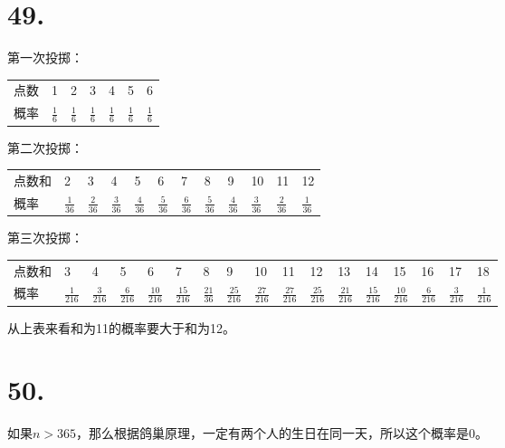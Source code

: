 \documentclass[UTF8]{report}
\begin{document}
    \section*{49.}
        第一次投掷：

        \begin{table}[!htbp]
            \begin{tabular}{lllllll}
                点数 & 1 & 2 & 3 & 4 & 5 & 6 \\
                概率 & $\frac{1}{6}$ & $\frac{1}{6}$ & $\frac{1}{6}$ &
                $\frac{1}{6}$ & $\frac{1}{6}$ & $\frac{1}{6}$
            \end{tabular}
        \end{table}

        第二次投掷：

        \begin{table}[!htbp]
            \begin{tabular}{llllllllllll}
                点数和 & 2 & 3 & 4 & 5 & 6 & 7 & 8 & 9 & 10 & 11 & 12 \\
                概率 & $\frac{1}{36}$ & $\frac{2}{36}$ & $\frac{3}{36}$ &
                $\frac{4}{36}$ & $\frac{5}{36}$ & $\frac{6}{36}$ &
                $\frac{5}{36}$ & $\frac{4}{36}$ & $\frac{3}{36}$ &
                $\frac{2}{36}$ & $\frac{1}{36}$
            \end{tabular}
        \end{table}

        第三次投掷：

        \begin{table}[!htbp]
            \begin{tabular}{lllllllllllllllll}
                点数和 & 3 & 4 & 5 & 6 & 7 & 8 & 9 & 10 & 11 & 12 & 13 & 14 & 15 & 16 & 17 & 18 \\
                概率 & $\frac{1}{216}$ & $\frac{3}{216}$ & $\frac{6}{216}$ &
                $\frac{10}{216}$ & $\frac{15}{216}$ & $\frac{21}{36}$ &
                $\frac{25}{216}$ & $\frac{27}{216}$ & $\frac{27}{216}$ &
                $\frac{25}{216}$ & $\frac{21}{216}$ & $\frac{15}{216}$ &
                $\frac{10}{216}$ & $\frac{6}{216}$ & $\frac{3}{216}$ &
                $\frac{1}{216}$
            \end{tabular}
        \end{table}

        从上表来看和为11的概率要大于和为12。
    \section*{50.}
        如果$n > 365$，那么根据鸽巢原理，一定有两个人的生日在同一天，所以这个概率是0。
\end{document}
